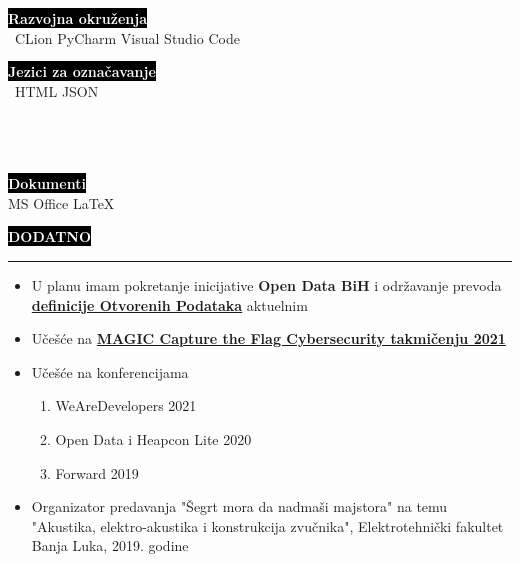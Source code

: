 \documentclass[9pt]{developercv} %
\begin{document}
\vspace{0.5cm}

\begin{minipage}[t]{0.4\textwidth}
	\vspace{-\baselineskip}
	
	\colorbox{black}{{\textcolor{white}{\textbf{Razvojna okruženja}}}}\smallskip\\\
	{CLion} \hspace{10} {PyCharm} \hspace{10} {Visual Studio Code}\smallskip\\
\end{minipage}
\hfill
\begin{minipage}[t]{0.3\textwidth}
	\vspace{-\baselineskip}
	
	\colorbox{black}{{\textcolor{white}{\textbf{Jezici za označavanje}}}}\smallskip\\\
	{HTML} \hspace{10} {JSON}\smallskip\\\\\\\
\end{minipage}
\hfill
\begin{minipage}[t]{0.2\textwidth}
	\vspace{-\baselineskip}
	
	\colorbox{black}{{\textcolor{white}{\textbf{Dokumenti}}}}\smallskip\\
	{MS Office} \hspace{10} {LaTeX}
\end{minipage}


\colorbox{black}{{\textcolor{white}{\textbf{\MakeUppercase{Dodatno}}}}}
\par\noindent\rule{\textwidth}{2px}
    \begin{itemize}
        \item U planu imam pokretanje inicijative {\textbf{Open Data BiH}} i održavanje prevoda {\href{https://opendefinition.org/od/2.1/bs/}{{\textbf{definicije Otvorenih Podataka}}}} aktuelnim
        \item Učešće na {\textbf{\href{https://magicinc.org/programs/cybersecurity/capture-the-flag}{MAGIC Capture the Flag Cybersecurity takmičenju 2021}}}
        \item Učešće na konferencijama
        \begin{enumerate}
            \item WeAreDevelopers 2021
            \item Open Data i Heapcon Lite 2020
            \item Forward 2019
        \end{enumerate}
        \item Organizator predavanja "Šegrt mora da nadmaši majstora" na temu "Akustika, elektro-akustika i konstrukcija zvučnika", Elektrotehnički fakultet Banja Luka, 2019. godine
    \end{itemize}
\end{document}

